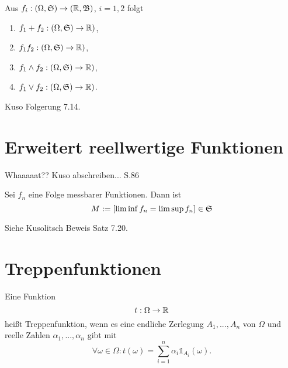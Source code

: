 			\begin{satz}
				Aus $f_i: (\Omega,\mathfrak{S})\to(\mathbb{R},\mathfrak{B})$, $i=1,2$ folgt
				\begin{enumerate}
					\item $f_1+f_2: (\Omega,\mathfrak{S})\to \mathbb{R})$,
					\item $f_1f_2: (\Omega,\mathfrak{S})\to \mathbb{R})$,
					\item $f_1\land f_2: (\Omega,\mathfrak{S})\to \mathbb{R})$,
					\item $f_1\lor f_2: (\Omega,\mathfrak{S})\to \mathbb{R})$.
				\end{enumerate}
			\end{satz}
			
			\begin{bew}
				Kuso Folgerung 7.14.
			\end{bew}
			
			\begin{defi}[7.14]
				
			\end{defi}
			
		\section{Erweitert reellwertige Funktionen}
			Whaaaaat??\newline
			Kuso abschreiben... S.86\newline
			\begin{satz}
				Sei $f_n$ eine Folge messbarer Funktionen. Dann ist 
				\[ M:=[\liminf f_n=\limsup f_n]\in\mathfrak{S} \]
			\end{satz}
			
			\begin{bew}
				Siehe Kusolitsch Beweis Satz 7.20. 
			\end{bew}
			
			\begin{satz}[7.24]
				
			\end{satz}
			
		\section{Treppenfunktionen}
			\begin{defi}
				Eine Funktion 
				\[ t:\Omega\to\mathbb{R} \]
				heißt Treppenfunktion, wenn es eine endliche Zerlegung $A_1,...,A_n$ von $\Omega$ und reelle Zahlen $\alpha_1,...,\alpha_n$ gibt mit
				\[ \forall \omega\in\Omega: t(\omega)=\sum_{i=1}^n\alpha_i\mathds{1}_{A_i}(\omega). \]
			\end{defi}
			
